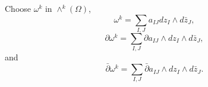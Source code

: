 
Choose $\omega^k$ in $\wedge^k(\Omega)$,
$$\omega^k = \sum_{I,J} a_{IJ} dz_I \wedge d\bar{z}_J,$$
$$\partial \omega^k = \sum_{I,J} \partial a_{IJ} \wedge dz_I \wedge d\bar{z}_J,$$
and
$$\bar{\partial} \omega^k = \sum_{I,J} \bar{\partial} a_{IJ} \wedge dz_I \wedge d\bar{z}_J.$$
